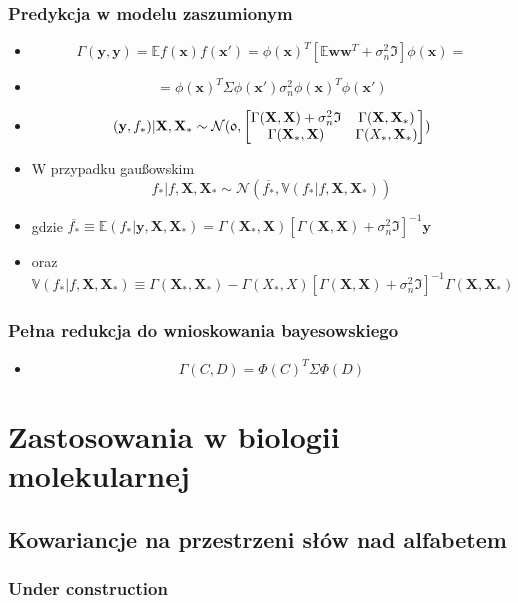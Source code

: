 \documentclass[draft, xetex]{beamer}
\newcommand{\xxx}{\mathbf{x}}
\newcommand{\www}{\mathbf{w}}
\newcommand{\yyy}{\mathbf{y}}
\newcommand{\X}{\mathbf{X}}
\begin{document}
\begin{frame}
	\frametitle{Predykcja w modelu zaszumionym}
	
	\begin{itemize}
		\item $$\Gamma(\yyy, \yyy) = \mathbb{E}f(\xxx)f(\xxx') = \phi(\xxx)^T [\mathbb{E} \www \www^T + \sigma_n^2 \mathfrak{I}] \phi(\xxx) =$$
		\item $$= \phi(\xxx)^T \Sigma \phi(\xxx') \sigma_n^2 \phi(\xxx)^T \phi(\xxx') $$
		\item $$(\yyy, f_*)|\X, \X_* \sim \mathcal{N}(\mathfrak{0}, \left [\begin{matrix}
		\Gamma(\X, \X) + \sigma^2_n \mathfrak{I}& \Gamma(\X, \X_*)\cr
		\Gamma(\X_*, \X) & \Gamma(X_*, \X_*)\cr
		\end{matrix} \right])$$
		
		\item W przypadku gau\ss owskim $$f_* | f, \X, \X_* \sim \mathcal{N}(\overline{f_*} , \mathbb{V}(f_*|f,\X,\X_*))$$
		\item gdzie $\overline{f_*} \equiv \mathbb{E}(f_*|\yyy,\X,\X_*) = \Gamma(\X_*,\X)[\Gamma(\X, \X)+ \sigma_n^2 \mathfrak{I}]^{-1} \yyy$
		\item oraz $\mathbb{V}(f_*|f,\X,\X_*) \equiv \Gamma(\X_*, \X_*) - \Gamma(X_*, X)[\Gamma(\X, \X)+\sigma_n^2 \mathfrak{I}]^{-1} \Gamma(\X, \X_*)$
	\end{itemize}
\end{frame}

\begin{frame}
	\frametitle{Pełna redukcja do wnioskowania bayesowskiego}
	
	\begin{itemize}
		\item $$\Gamma(C,D) = \Phi(C)^T \Sigma \Phi(D)$$
	\end{itemize}
\end{frame}

\section[Biologia]{Zastosowania w biologii molekularnej}

\subsection[Dobre kowariancje]{Kowariancje na przestrzeni słów nad alfabetem}

\begin{frame}
	\frametitle{Under construction}
\end{frame}
\end{document}
